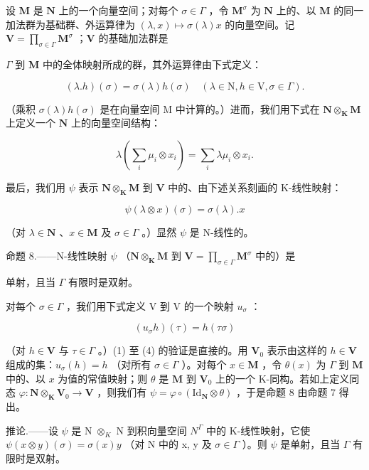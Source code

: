 设 \(\mathbf{M}\) 是 \(\mathbf{N}\) 上的一个向量空间；对每个 \(\sigma \in \Gamma\) ，令 \(\mathbf{M}^{\sigma}\) 为 \(\mathbf{N}\) 上的、以 \(\mathbf{M}\) 的同一加法群为基础群、外运算律为 \((\lambda, x) \mapsto \sigma(\lambda)x\) 的向量空间。记 \(\mathbf{V} = \prod_{\sigma \in \Gamma} \mathbf{M}^{\sigma}\) ；\(\mathbf{V}\) 的基础加法群是

\(\Gamma\) 到 \(\mathbf{M}\) 中的全体映射所成的群，其外运算律由下式定义：

\[
(\lambda . h) (\sigma) = \sigma (\lambda) h (\sigma) \quad (\lambda \in \mathrm{N}, h \in \mathrm{V}, \sigma \in \Gamma).\tag{5}
\]

（乘积 \(\sigma(\lambda) h(\sigma)\) 是在向量空间 M 中计算的。）进而，我们用下式在 \(\mathbf{N} \otimes_{\mathbf{K}} \mathbf{M}\) 上定义一个 \(\mathbf{N}\) 上的向量空间结构：

\[
\lambda \left(\sum_ {i} \mu_ {i} \otimes x _ {i}\right) = \sum_ {i} \lambda \mu_ {i} \otimes x _ {i}.
\]

最后，我们用 \(\psi\) 表示 \(\mathbf{N} \otimes_{\mathbf{K}} \mathbf{M}\) 到 \(\mathbf{V}\) 中的、由下述关系刻画的 K-线性映射：

\[
\psi (\lambda \otimes x) (\sigma) = \sigma (\lambda). x\tag{6}
\]

（对 \(\lambda \in \mathbf{N}\) 、\(x \in \mathbf{M}\) 及 \(\sigma \in \Gamma\) 。）显然 \(\psi\) 是 N-线性的。

命题 8.——N-线性映射 \(\psi\) （\(\mathbf{N} \otimes_{\mathbf{K}} \mathbf{M}\) 到 \(\mathbf{V} = \prod_{\sigma \in \Gamma} \mathbf{M}^{\sigma}\) 中的）是

单射，且当 \(\Gamma\) 有限时是双射。

对每个 \(\sigma\in\Gamma\) ，我们用下式定义 V 到 V 的一个映射 \(u_{\sigma}\) ：

\[
\left(u _ {\sigma} h\right) (\tau) = h (\tau \sigma)\tag{7}
\]

（对 \(h \in \mathbf{V}\) 与 \(\tau \in \Gamma\) 。）(1) 至 (4) 的验证是直接的。用 \(\mathbf{V}_0\) 表示由这样的 \(h \in \mathbf{V}\) 组成的集：\(u_{\sigma}(h) = h\) （对所有 \(\sigma \in \Gamma\) ）。对每个 \(x \in \mathbf{M}\) ，令 \(\theta(x)\) 为 \(\Gamma\) 到 \(\mathbf{M}\) 中的、以 \(x\) 为值的常值映射；则 \(\theta\) 是 \(\mathbf{M}\) 到 \(\mathbf{V}_0\) 上的一个 K-同构。若如上定义同态 \(\varphi: \mathbf{N} \otimes_{\mathbf{K}} \mathbf{V}_0 \to \mathbf{V}\) ，则我们有 \(\psi = \varphi \circ (\mathrm{Id}_{\mathbf{N}} \otimes \theta)\) ，于是命题 8 由命题 7 得出。

推论.——设 \(\psi\) 是 N \(\otimes_{K}\) N 到积向量空间 \(N^{\Gamma}\) 中的 K-线性映射，它使 \(\psi(x \otimes y) (\sigma) = \sigma(x)y\) （对 N 中的 x, y 及 \(\sigma \in \Gamma\) ）。则 \(\psi\) 是单射，且当 \(\Gamma\) 有限时是双射。

